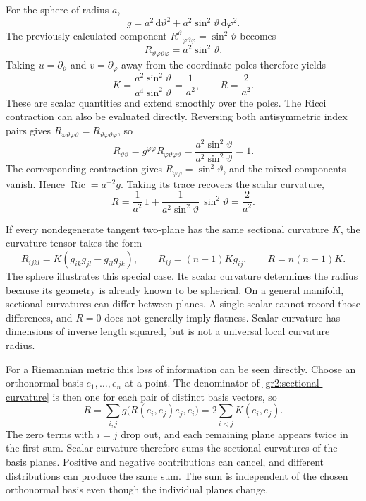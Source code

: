 \documentclass[11pt,a4paper]{article}
\numberwithin{equation}{section}
\newcommand{\dd}{\mathrm d}
\begin{document}
For the sphere of radius \(a\),
\[
 g=a^2\,\dd\vartheta^2+a^2\sin^2\vartheta\,\dd\varphi^2.
\]
The previously calculated component
\(R^\vartheta{}_{\varphi\vartheta\varphi}=\sin^2\vartheta\)
becomes
\[
 R_{\vartheta\varphi\vartheta\varphi}
 =a^2\sin^2\vartheta.
\]
Taking \(u=\partial_\vartheta\) and \(v=\partial_\varphi\) away
from the coordinate poles therefore yields
\begin{equation}
 K=\frac{a^2\sin^2\vartheta}{a^4\sin^2\vartheta}
   =\frac1{a^2},
 \qquad R=\frac2{a^2}.
 \label{gr2:sphere-sectional-curvature}
\end{equation}
These are scalar quantities and extend smoothly over the poles.
The Ricci contraction can also be evaluated directly. Reversing
both antisymmetric index pairs gives
\(R_{\varphi\vartheta\varphi\vartheta}
=R_{\vartheta\varphi\vartheta\varphi}\), so
\[
 R_{\vartheta\vartheta}
 =g^{\varphi\varphi}R_{\varphi\vartheta\varphi\vartheta}
 =\frac{a^2\sin^2\vartheta}{a^2\sin^2\vartheta}=1.
\]
The corresponding contraction gives
\(R_{\varphi\varphi}=\sin^2\vartheta\), and the mixed components
vanish. Hence \(\operatorname{Ric}=a^{-2}g\). Taking its trace
recovers the scalar curvature,
\[
 R=\frac{1}{a^2}\,1
  +\frac{1}{a^2\sin^2\vartheta}\,\sin^2\vartheta
  =\frac{2}{a^2}.
\]

If every nondegenerate tangent two-plane has the same sectional
curvature \(K\), the curvature tensor takes the form
\[
 R_{ijkl}=K(g_{ik}g_{jl}-g_{il}g_{jk}),
 \qquad R_{ij}=(n-1)Kg_{ij},
 \qquad R=n(n-1)K.
\]
The sphere illustrates this special case. Its scalar curvature
determines the radius because its geometry is already known to be
spherical. On a general manifold, sectional curvatures can differ
between planes. A single scalar cannot record those differences,
and \(R=0\) does not generally imply flatness. Scalar curvature has
dimensions of inverse length squared, but is not a universal local
curvature radius.

For a Riemannian metric this loss of information can be seen directly.
Choose an orthonormal basis \(e_1,\ldots,e_n\) at a point. The
denominator of \eqref{gr2:sectional-curvature} is then one for
each pair of distinct basis vectors, so
\[
 R=\sum_{i,j}g\bigl(R(e_i,e_j)e_j,e_i\bigr)
  =2\sum_{i<j}K(e_i,e_j).
\]
The zero terms with \(i=j\) drop out, and each remaining plane
appears twice in the first sum. Scalar curvature therefore sums
the sectional curvatures of the basis planes. Positive and
negative contributions can cancel, and different distributions
can produce the same sum. The sum is independent of the chosen
orthonormal basis even though the individual planes change.
\end{document}
